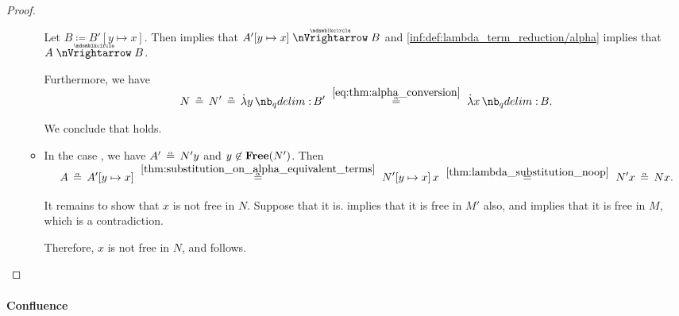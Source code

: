 \begin{proof}
\begin{itemize}
\begin{itemize}
      Let \( B \coloneqq B'[y \mapsto x] \). Then  implies that \( A'[y \mapsto x] \ppred B \) and \ref{inf:def:lambda_term_reduction/alpha} implies that \( A \ppred B \).

      Furthermore, we have
      \begin{equation*}
        N
        \aequiv
        N'
        \aequiv
        \qabs y B'
        \reloset {\eqref{eq:thm:alpha_conversion}} \aequiv
        \qabs x B.
      \end{equation*}

      We conclude that  holds.

      \item In the case , we have \( A' \aequiv N'y \) and \( y \not\in \op*{Free}(N') \). Then
      \begin{equation*}
        A
        \aequiv
        A'[y \mapsto x]
        \reloset {\ref{thm:substitution_on_alpha_equivalent_terms}} \aequiv
        N'[y \mapsto x] \thinspace x
        \reloset {\ref{thm:lambda_substitution_noop}} =
        N' x
        \aequiv
        N x.
      \end{equation*}

      It remains to show that \( x \) is not free in \( N \). Suppose that it is.  implies that it is free in \( M' \) also, and  implies that it is free in \( M \), which is a contradiction.

      Therefore, \( x \) is not free in \( N \), and  follows.
    \end{itemize}
  \end{itemize}
\end{proof}

\paragraph{Confluence}

